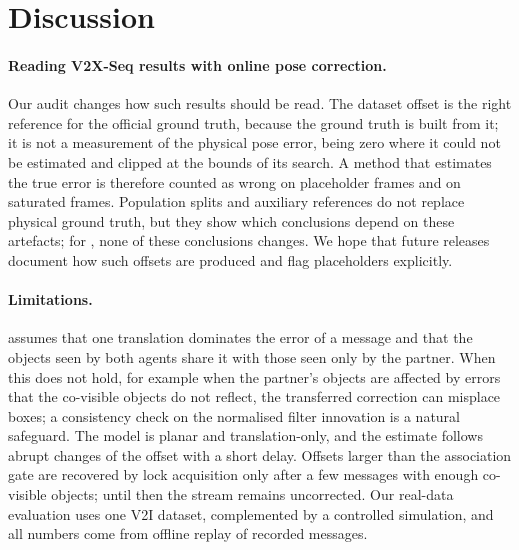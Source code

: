 \section{Discussion}
\label{sec:discussion}

\paragraph{Reading V2X-Seq results with online pose correction.}
Our audit changes how such results should be read.
The dataset offset is the right reference for the official ground truth, because the ground truth is built from it; it is not a measurement of the physical pose error, being zero where it could not be estimated and clipped at the bounds of its search.
A method that estimates the true error is therefore counted as wrong on placeholder frames and on saturated frames.
Population splits and auxiliary references do not replace physical ground truth, but they show which conclusions depend on these artefacts; for \method, none of these conclusions changes.
We hope that future releases document how such offsets are produced and flag placeholders explicitly.

\paragraph{Limitations.}
\method assumes that one translation dominates the error of a message and that the objects seen by both agents share it with those seen only by the partner.
When this does not hold, for example when the partner's objects are affected by errors that the co-visible objects do not reflect, the transferred correction can misplace boxes; a consistency check on the normalised filter innovation is a natural safeguard.
The model is planar and translation-only, and the estimate follows abrupt changes of the offset with a short delay.
Offsets larger than the association gate are recovered by lock acquisition only after a few messages with enough co-visible objects; until then the stream remains uncorrected.
Our real-data evaluation uses one V2I dataset, complemented by a controlled simulation, and all numbers come from offline replay of recorded messages.

